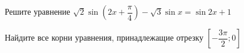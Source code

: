 \begin{ex}
	\begin{condition}
		\begin{enumcols}[label=\asbuk*)]
			\item Решите уравнение \( \sqrt{2}\sin{\left(2x + \dfrac{\pi}{4}\right)} - \sqrt{3}\sin x = \sin 2x + 1 \)
			\item Найдите все корни уравнения, принадлежащие отрезку \(   \left[-\dfrac{3\pi}{2};0\right] \)
		\end{enumcols}
	\end{condition}
\end{ex}